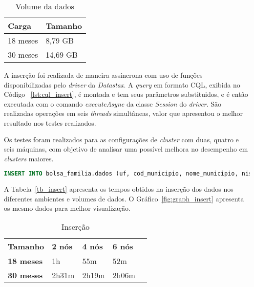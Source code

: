 \begin{table}[]
	\centering
	\caption{Volume da dados}
	\label{tab:volume}
	\begin{tabular}{ll}
		\textbf{Carga} & \textbf{Tamanho} \\ \hline
		18 meses     &  8,79 GB              \\ \hline
		30 meses    &  14,69 GB             \\ \hline
	\end{tabular}
\end{table}

A inserção foi realizada de maneira assíncrona com uso de funções disponibilizadas pelo \emph{driver} da \emph{Datastax}. A \emph{query} em formato CQL, exibida no Código ~\ref{lst:cql_insert}, é montada e tem seus parâmetros substituidos, e é então executada com o comando \emph{executeAsync} da classe \emph{Session} do \emph{driver}. São realizadas operações em seis \emph{threads} simultâneas, valor que apresentou o melhor resultado nos testes realizados.

Os testes foram realizados para as configurações de \emph{cluster} com duas, quatro e seis máquinas, com objetivo de analisar uma possível melhora no desempenho em \emph{clusters} maiores.

\begin{lstlisting}[caption={Código CQL para inserção},label={lst:cql_insert},language=SQL]
INSERT INTO bolsa_familia.dados (uf, cod_municipio, nome_municipio, nis_favorecido, nome_favorecido, fonte, valor, periodo) VALUES (?, ?, ?, ?, ?, ?, ?, ?)
\end{lstlisting}

A Tabela~\ref{tb_insert} apresenta os tempos obtidos na inserção dos dados nos diferentes ambientes e volumes de dados. O Gráfico~\ref{fig:graph_insert} apresenta os mesmo dados para melhor visualização.


\begin{table}[]
	\centering
	\caption{Inserção}
	\label{tb:comparativo_insert}
	\begin{tabular}{lllll}
		\textbf{Tamanho}	& \textbf{2 nós} & \textbf{4 nós} & \textbf{6 nós} \\ \hline
		\textbf{18 meses}   	& 1h         	 & 55m       	  & 52m            \\ \hline
		\textbf{30 meses}     & 2h31m      	 & 2h19m          & 2h06m          \\ \hline
	\end{tabular}
\end{table}

